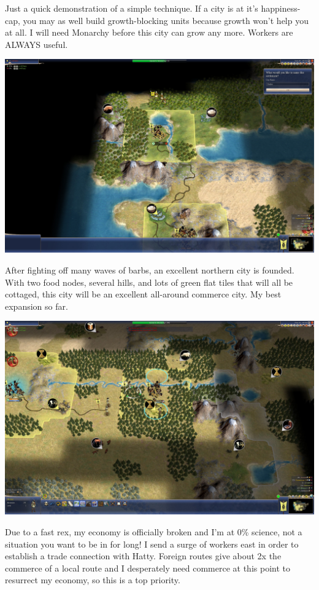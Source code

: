 \documentclass[10pt]{article}
\begin{document}
Just a quick demonstration of a simple technique. If a city is at it's happiness-cap, you may as well build
growth-blocking units because growth won't help you at all. I will need Monarchy before this city can
grow any more. Workers are ALWAYS useful.

\includegraphics[width=1.0\textwidth]{57}

After fighting off many waves of barbs, an excellent northern city is founded. With two food nodes, several
hills, and lots of green flat tiles that will all be cottaged, this city will be an excellent all-around
commerce city. My best expansion so far.

\includegraphics[width=1.0\textwidth]{58}

Due to a fast rex, my economy is officially broken and I'm at 0\% science, not a situation you want to be in
for long! I send a surge of workers east in order to establish a trade connection with Hatty. Foreign routes
give about 2x the commerce of a local route and I desperately need commerce at this point to resurrect my
economy, so this is a top priority.
\end{document}
